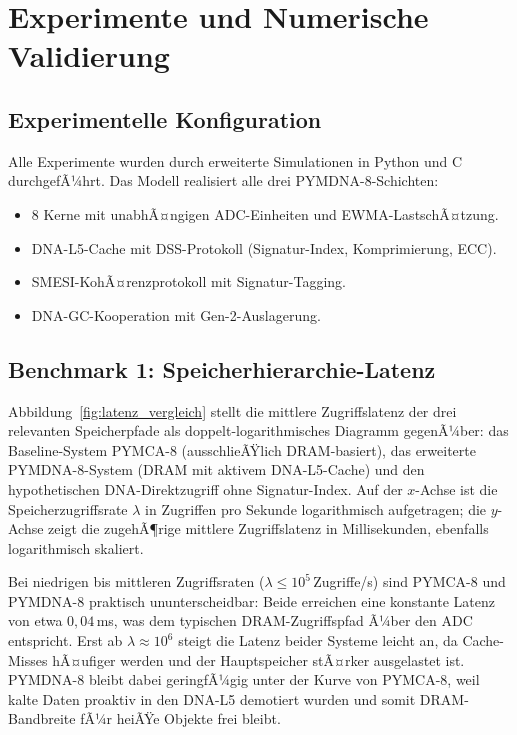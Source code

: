 ﻿\documentclass[a4paper,12pt]{article}
\theoremstyle{definition}
\begin{document}
\section{Experimente und Numerische Validierung}

\subsection{Experimentelle Konfiguration}

Alle Experimente wurden durch erweiterte Simulationen in Python und C
durchgefÃ¼hrt. Das Modell realisiert alle drei PYMDNA-8-Schichten:

\begin{itemize}[noitemsep]
  \item 8 Kerne mit unabhÃ¤ngigen ADC-Einheiten und EWMA-LastschÃ¤tzung.
  \item DNA-L5-Cache mit DSS-Protokoll (Signatur-Index, Komprimierung, ECC).
  \item SMESI-KohÃ¤renzprotokoll mit Signatur-Tagging.
  \item DNA-GC-Kooperation mit Gen-2-Auslagerung.
\end{itemize}

\subsection{Benchmark 1: Speicherhierarchie-Latenz}

Abbildung~\ref{fig:latenz_vergleich} stellt die mittlere Zugriffslatenz der drei relevanten Speicherpfade als doppelt-logarithmisches Diagramm gegenÃ¼ber: das Baseline-System PYMCA-8 (ausschlieÃŸlich DRAM-basiert), das erweiterte PYMDNA-8-System (DRAM mit aktivem DNA-L5-Cache) und den hypothetischen DNA-Direktzugriff ohne Signatur-Index. Auf der $x$-Achse ist die Speicherzugriffsrate $\lambda$ in Zugriffen pro Sekunde logarithmisch aufgetragen; die $y$-Achse zeigt die zugehÃ¶rige mittlere Zugriffslatenz in Millisekunden, ebenfalls logarithmisch skaliert.

Bei niedrigen bis mittleren Zugriffsraten ($\lambda \leq 10^5$\,Zugriffe/s) sind PYMCA-8 und PYMDNA-8 praktisch ununterscheidbar: Beide erreichen eine konstante Latenz von etwa $0{,}04$\,ms, was dem typischen DRAM-Zugriffspfad Ã¼ber den ADC entspricht. Erst ab $\lambda \approx 10^6$ steigt die Latenz beider Systeme leicht an, da Cache-Misses hÃ¤ufiger werden und der Hauptspeicher stÃ¤rker ausgelastet ist. PYMDNA-8 bleibt dabei geringfÃ¼gig unter der Kurve von PYMCA-8, weil kalte Daten proaktiv in den DNA-L5 demotiert wurden und somit DRAM-Bandbreite fÃ¼r heiÃŸe Objekte frei bleibt.
\end{document}
